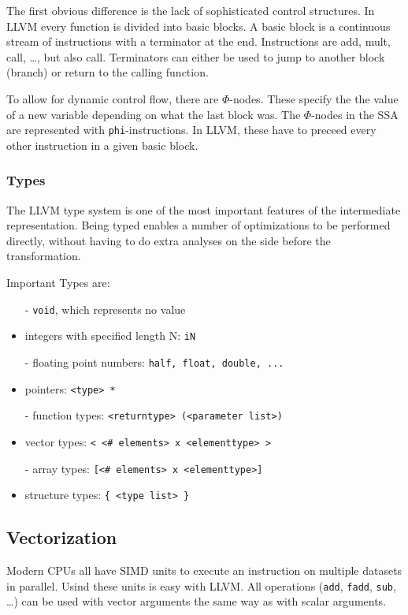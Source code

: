 \documentclass[a4paper,bibliography=totocnumbered,parskip,headsepline]{scrbook}
\begin{document}
The first obvious difference is the lack of sophisticated control structures.
In LLVM every function is divided into basic blocks.
A basic block is a continuous stream of instructions with a terminator at the end.
Instructions are add, mult, call, \dots, but also call.
Terminators can either be used to jump to another block (branch) or return to the calling function.

To allow for dynamic control flow, there are $\Phi$-nodes.
These specify the the value of a new variable depending on what the last block was.
The $\Phi$-nodes in the SSA are represented with \lstinline{phi}-instructions.
In LLVM, these have to preceed every other instruction in a given basic block.

\subsubsection{Types}
The LLVM type system is one of the most important features of the intermediate representation.
Being typed enables a number of optimizations to be performed directly, without having to do extra analyses on the side before the transformation.

Important Types are:
\begin{itemize}[noitemsep]
\item[-] \lstinline{void}, which represents no value
\item[-] integers with specified length N: \lstinline{iN}
\item[-] floating point numbers: \lstinline{half, float, double, ...}
\item[-] pointers: \lstinline{<type> *}
\item[-] function types: \lstinline{<returntype> (<parameter list>)}
\item[-] vector types: \lstinline{< <# elements> x <elementtype> >}
\item[-] array types: \lstinline{[<# elements> x <elementtype>]}
\item[-] structure types: \lstinline!{ <type list> }!
\end{itemize}

\subsection{Vectorization}
Modern CPUs all have SIMD units to execute an instruction on multiple datasets in parallel.
Usind these units is easy with LLVM.
All operations (\lstinline{add}, \lstinline{fadd}, \lstinline{sub}, \dots) can be used with vector arguments the same way as with scalar arguments.
\end{document}

